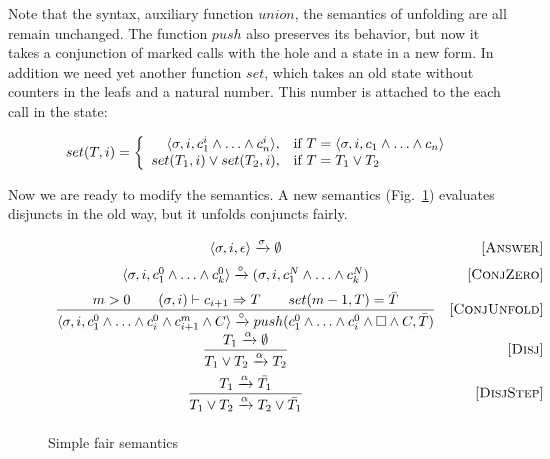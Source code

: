 Note that the syntax, auxiliary function $union$, the semantics of unfolding are all remain unchanged. The function $push$ also preserves its behavior, but now it takes a conjunction of marked
calls with the hole and a state in a new form. In addition we need yet another function $set$, which takes an old state without counters in the leafs and a natural number. This number is
attached to the each call in the state:

\[
set(T, i) =
\left\{
\begin{array}{rl}
\langle \sigma, i, c_1^i \land \ldots \land c_n^i \rangle, & \mbox{if } T = \langle \sigma, i, c_1 \land \ldots \land c_n \rangle \\
set(T_1, i) \lor set(T_2, i), & \mbox{if } T = T_1 \lor T_2
\end{array}
\right.
\]

Now we are ready to modify the semantics. A new semantics (Fig.~\ref{fair:naive-semantics}) evaluates disjuncts in the old way,
but it unfolds conjuncts fairly.

\begin{figure}[h!]
\[\begin{array}{cr}

      {\langle \sigma, i, \epsilon \rangle \xrightarrow{\sigma} \emptyset}  
&     \mbox{[\textsc{Answer}]} \\[2mm]
      {\langle \sigma, i, c_1^0 \land \ldots \land c_k^0 \rangle \xrightarrow{\circ} (\sigma, i, c_1^N \land \ldots \land c_k^N)}
&     \mbox{[\textsc{ConjZero}]} \\[2mm]
\dfrac{m > 0 \qquad (\sigma, i) \vdash c_{i+1} \Rightarrow T \qquad set(m - 1, T) = \bar{T}}
      {\langle \sigma, i, c_1^0 \land \ldots \land c_i^0 \land c_{i+1}^m \land C \rangle \xrightarrow{\circ} push(c_1^0 \land \ldots \land c_i^0 \land \Box \land C, \bar{T})}
&     \mbox{[\textsc{ConjUnfold}]} \\[2mm]
\dfrac{T_1 \xrightarrow{\alpha} \emptyset}
      {T_1 \lor T_2 \xrightarrow{\alpha} T_2}
&     \mbox{[\textsc{Disj}]} \\[4mm]
\dfrac{T_1 \xrightarrow{\alpha} \bar{T_1}}
      {T_1 \lor T_2 \xrightarrow{\alpha} T_2 \lor\bar{T_1}}
&     \mbox{[\textsc{DisjStep}]} \\[4mm]
\end{array}\]
\caption{Simple fair semantics}
\label{fair:naive-semantics}
\end{figure}

